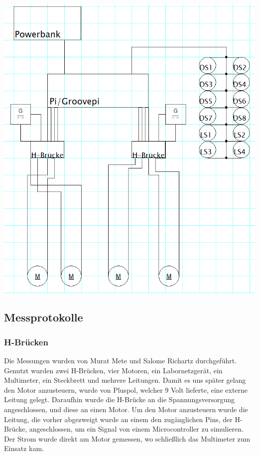 \documentclass[notitlepage]{report}
\begin{document}
\includegraphics[scale=0.5]{1.png}

\subsection{Messprotokolle}

\subsubsection{H-Br\"{u}cken}
Die Messungen wurden von Murat Mete und Salome Richartz durchgef\"{u}hrt. Genutzt wurden zwei H-Br\"{u}cken, vier Motoren, ein Labornetzger\"{a}t, ein Multimeter, ein Steckbrett und mehrere Leitungen. Damit es uns sp\"{a}ter gelang den Motor anzusteuern, wurde von Pluspol, welcher 9 Volt lieferte, eine externe Leitung gelegt. Daraufhin wurde die H-Br\"{u}cke an die Spannungsversorgung angeschlossen, und diese an einen Motor. Um den Motor anzusteuern wurde die Leitung, die vorher abgezweigt wurde an einem den zug\"{a}nglichen Pins, der H-Br\"{u}cke, angeschlossen, um ein Signal von einem Microcontroller zu simulieren. Der Strom wurde direkt am Motor gemessen, wo schlie{\ss}lich das Multimeter zum Einsatz kam.
\end{document}
